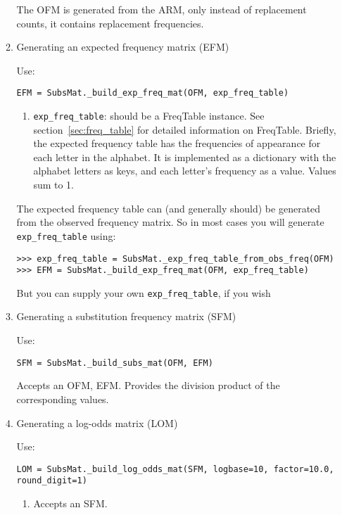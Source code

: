 \begin{enumerate}
\begin{enumerate}
  The OFM is generated from the ARM, only instead of replacement counts, it contains replacement frequencies.

\item Generating an expected frequency matrix (EFM)

Use:

\begin{verbatim}
EFM = SubsMat._build_exp_freq_mat(OFM, exp_freq_table)
\end{verbatim}

  \begin{enumerate}
    \item \verb|exp_freq_table|: should be a FreqTable instance. See section~\ref{sec:freq_table} for detailed information on FreqTable. Briefly, the expected frequency table has the frequencies of appearance for each letter in the alphabet. It is implemented as a dictionary with the alphabet letters as keys, and each letter's frequency as a value. Values sum to 1.
  \end{enumerate}

The expected frequency table can (and generally should) be generated from the observed frequency matrix. So in most cases you will generate \verb|exp_freq_table| using:

\begin{verbatim}
>>> exp_freq_table = SubsMat._exp_freq_table_from_obs_freq(OFM)
>>> EFM = SubsMat._build_exp_freq_mat(OFM, exp_freq_table)
\end{verbatim}

But you can supply your own \verb|exp_freq_table|, if you wish

\item Generating a substitution frequency matrix (SFM)

Use:

\begin{verbatim}
SFM = SubsMat._build_subs_mat(OFM, EFM)
\end{verbatim}

  Accepts an OFM, EFM. Provides the division product of the corresponding values.

\item Generating a log-odds matrix (LOM)

   Use:
\begin{verbatim}
LOM = SubsMat._build_log_odds_mat(SFM, logbase=10, factor=10.0, round_digit=1)
\end{verbatim}

   \begin{enumerate}
     \item Accepts an SFM.


\end{enumerate}
\end{enumerate}
\end{enumerate}
